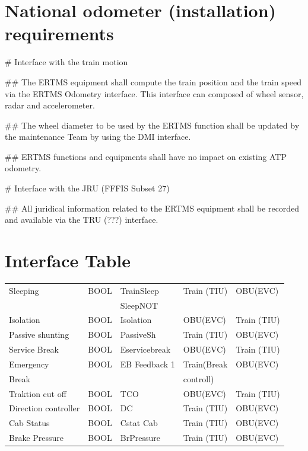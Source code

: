 \documentclass{template/openetcs_article}
\begin{document}
\section{National odometer (installation) requirements}

\begin{easylist}
# Interface with the train motion

## The ERTMS equipment shall compute the train position and the train speed via the ERTMS Odometry interface. This interface can composed of wheel sensor, radar and accelerometer.

## The wheel diameter to be used by the ERTMS function shall be updated by the maintenance Team by using the DMI interface.


## ERTMS functions and equipments shall have no impact on existing ATP odometry.

# Interface with the JRU (FFFIS Subset 27)

## All juridical information related to the ERTMS equipment shall be recorded and available via the TRU (???) interface.


\end{easylist}
\newpage
\section{Interface Table}
\begin{supertabular}{| m{2.5 cm} | m{2.5 cm} | m{2.5 cm} | m{2.5cm} |m{2.5cm} |}
Sleeping & BOOL & TrainSleep & Train (TIU) & OBU(EVC)\\
 &  &  SleepNOT &  & \\\hline
Isolation & BOOL & Isolation & OBU(EVC) & Train (TIU)\\\hline
Passive shunting & BOOL & PassiveSh & Train (TIU) & OBU(EVC)\\\hline
Service Break & BOOL & Eservicebreak & OBU(EVC) & Train (TIU)\\\hline
 Emergency & BOOL & EB Feedback 1 & Train(Break & OBU(EVC)\\
 Break &  &  & controll) & \\\hline
 Traktion cut off & BOOL & TCO & OBU(EVC) & Train (TIU)\\\hline
 Direction controller & BOOL & DC & Train (TIU) & OBU(EVC)\\\hline
 Cab Status & BOOL & Cstat Cab & Train (TIU) & OBU(EVC)\\\hline
 Brake Pressure & BOOL & BrPressure & Train (TIU) & OBU(EVC)\\\hline
\end{supertabular}
\end{document}
